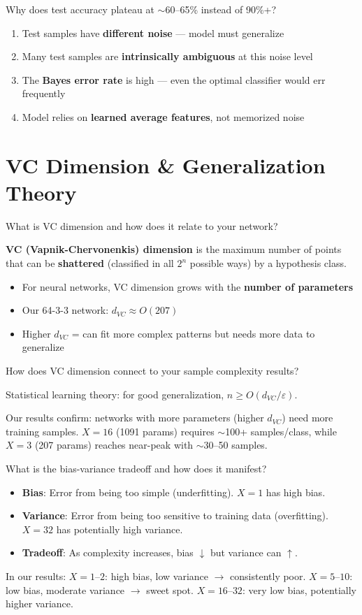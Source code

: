 \documentclass[11pt,a4paper]{article}
\newcounter{qcounter}
\newcommand{\vq}[1]{\stepcounter{qcounter}\begin{tcolorbox}[qbox, title=Q\theqcounter]#1\end{tcolorbox}}
\newcommand{\va}[1]{\begin{tcolorbox}[abox, title=Answer]#1\end{tcolorbox}\vspace{6pt}}
\begin{document}
\vq{Why does test accuracy plateau at $\sim$60--65\% instead of 90\%+?}
\va{
\begin{enumerate}[nosep]
    \item Test samples have \textbf{different noise} — model must generalize
    \item Many test samples are \textbf{intrinsically ambiguous} at this noise level
    \item The \textbf{Bayes error rate} is high — even the optimal classifier would err frequently
    \item Model relies on \textbf{learned average features}, not memorized noise
\end{enumerate}
}

\section{VC Dimension \& Generalization Theory}

\vq{What is VC dimension and how does it relate to your network?}
\va{\textbf{VC (Vapnik-Chervonenkis) dimension} is the maximum number of points that can be \textbf{shattered} (classified in all $2^n$ possible ways) by a hypothesis class.
\begin{itemize}[nosep]
    \item For neural networks, VC dimension grows with the \textbf{number of parameters}
    \item Our 64-3-3 network: $d_{VC} \approx O(207)$
    \item Higher $d_{VC}$ = can fit more complex patterns but needs more data to generalize
\end{itemize}
}

\vq{How does VC dimension connect to your sample complexity results?}
\va{Statistical learning theory: for good generalization, $n \geq O(d_{VC} / \varepsilon)$.

Our results confirm: networks with more parameters (higher $d_{VC}$) need more training samples. $X=16$ (1091 params) requires $\sim$100+ samples/class, while $X=3$ (207 params) reaches near-peak with $\sim$30--50 samples.}

\vq{What is the bias-variance tradeoff and how does it manifest?}
\va{
\begin{itemize}[nosep]
    \item \textbf{Bias}: Error from being too simple (underfitting). $X=1$ has high bias.
    \item \textbf{Variance}: Error from being too sensitive to training data (overfitting). $X=32$ has potentially high variance.
    \item \textbf{Tradeoff}: As complexity increases, bias $\downarrow$ but variance can $\uparrow$.
\end{itemize}
In our results: $X=1$--$2$: high bias, low variance $\to$ consistently poor. $X=5$--$10$: low bias, moderate variance $\to$ sweet spot. $X=16$--$32$: very low bias, potentially higher variance.
}
\end{document}
